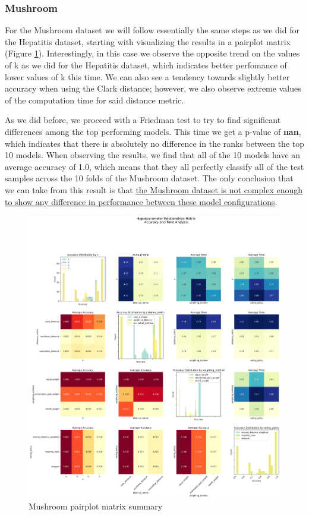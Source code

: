 \subsubsection{Mushroom}
For the Mushroom dataset we will follow essentially the same steps as we did for the Hepatitis dataset, starting with visualizing the results in a pairplot matrix (Figure \ref{fig:mush:pairplot}). Interestingly, in this case we observe the opposite trend on the values of k as we did for the Hepatitis dataset, which indicates better perfomance of lower values of k this time. We can also see a tendency towards slightly better accuracy when using the Clark distance; however, we also observe extreme values of the computation time for said distance metric.

As we did before, we proceed with a Friedman test to try to find significant differences among the top performing models. This time we get a p-value of \textbf{nan}, which indicates that there is absolutely no difference in the ranks between the top 10 models. When observing the results, we find that all of the 10 models have an average accuracy of 1.0, which means that they all perfectly classify all of the test samples across the 10 folds of the Mushroom dataset. The only conclusion that we can take from this result is that \uline{the Mushroom dataset is not complex enough to show any difference in performance between these model configurations}.

\begin{figure}[H]
    \centering
    \includegraphics[width=\textwidth]{figures/knn/mushroom/hyperparameter_pairplot_matrix.png}
    \caption{Mushroom pairplot matrix summary}
    \label{fig:mush:pairplot}
\end{figure}
\FloatBarrier

